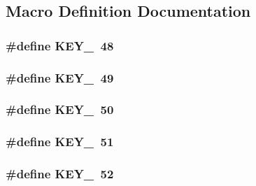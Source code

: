 \subsection{Macro Definition Documentation}
\hypertarget{group___keys_ga51ca76d1508339b071a974798b90474b}{
\subsubsection[{K\-E\-Y\-\_\-0}]{\setlength{\rightskip}{0pt plus 5cm}\#define K\-E\-Y\-\_~48}}\label{group___keys_ga51ca76d1508339b071a974798b90474b}
\hypertarget{group___keys_ga5a7fd35018971faa28dacd3e33a8f737}{
\subsubsection[{K\-E\-Y\-\_\-1}]{\setlength{\rightskip}{0pt plus 5cm}\#define K\-E\-Y\-\_~49}}\label{group___keys_ga5a7fd35018971faa28dacd3e33a8f737}
\hypertarget{group___keys_ga3a146cb397d373be978dfa9fd1dc9b3a}{
\subsubsection[{K\-E\-Y\-\_\-2}]{\setlength{\rightskip}{0pt plus 5cm}\#define K\-E\-Y\-\_~50}}\label{group___keys_ga3a146cb397d373be978dfa9fd1dc9b3a}
\hypertarget{group___keys_ga701a135e841c3cfb69d9c5bb1444e198}{
\subsubsection[{K\-E\-Y\-\_\-3}]{\setlength{\rightskip}{0pt plus 5cm}\#define K\-E\-Y\-\_~51}}\label{group___keys_ga701a135e841c3cfb69d9c5bb1444e198}
\hypertarget{group___keys_ga219891753a1b6ccd51c8ae763905dbf9}{
\subsubsection[{K\-E\-Y\-\_\-4}]{\setlength{\rightskip}{0pt plus 5cm}\#define K\-E\-Y\-\_~52}}\label{group___keys_ga219891753a1b6ccd51c8ae763905dbf9}
